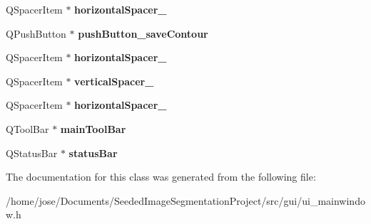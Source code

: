 \begin{DoxyCompactItemize}
\item 
\hypertarget{classUi__MainWindow_a4fc05b11984637298795a354792c4023}{Q\-Spacer\-Item $\ast$ {\bfseries horizontal\-Spacer\-\_}}\label{classUi__MainWindow_a4fc05b11984637298795a354792c4023}

\item 
\hypertarget{classUi__MainWindow_a6c72954e07c555c318c31c88c9a701bb}{Q\-Push\-Button $\ast$ {\bfseries push\-Button\-\_\-save\-Contour}}\label{classUi__MainWindow_a6c72954e07c555c318c31c88c9a701bb}

\item 
\hypertarget{classUi__MainWindow_a100e0ffd031f76754eba5078288deabf}{Q\-Spacer\-Item $\ast$ {\bfseries horizontal\-Spacer\-\_}}\label{classUi__MainWindow_a100e0ffd031f76754eba5078288deabf}

\item 
\hypertarget{classUi__MainWindow_ac845bdf6b5b5237378a7b067808b7a31}{Q\-Spacer\-Item $\ast$ {\bfseries vertical\-Spacer\-\_}}\label{classUi__MainWindow_ac845bdf6b5b5237378a7b067808b7a31}

\item 
\hypertarget{classUi__MainWindow_a9a022556cf8ce3fa47e51d79cb222ab0}{Q\-Spacer\-Item $\ast$ {\bfseries horizontal\-Spacer\-\_}}\label{classUi__MainWindow_a9a022556cf8ce3fa47e51d79cb222ab0}

\item 
\hypertarget{classUi__MainWindow_a5172877001c8c7b4e0f6de50421867d1}{Q\-Tool\-Bar $\ast$ {\bfseries main\-Tool\-Bar}}\label{classUi__MainWindow_a5172877001c8c7b4e0f6de50421867d1}

\item 
\hypertarget{classUi__MainWindow_a50fa481337604bcc8bf68de18ab16ecd}{Q\-Status\-Bar $\ast$ {\bfseries status\-Bar}}\label{classUi__MainWindow_a50fa481337604bcc8bf68de18ab16ecd}

\end{DoxyCompactItemize}


The documentation for this class was generated from the following file\-:\begin{DoxyCompactItemize}
\item 
/home/jose/\-Documents/\-Seeded\-Image\-Segmentation\-Project/src/gui/ui\-\_\-mainwindow.\-h\end{DoxyCompactItemize}
